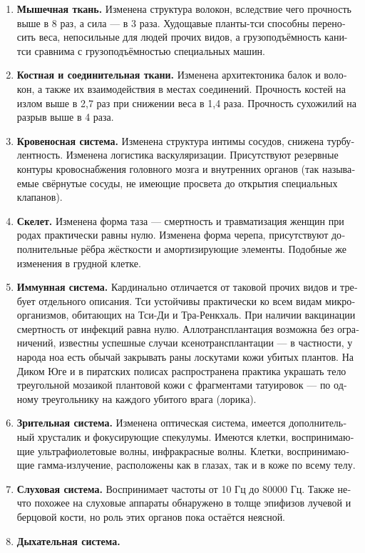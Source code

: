 \documentclass[a4paper,12pt,fleqn]{book}\usepackage{polyglossia}\setdefaultlanguage[babelshorthands=true]{russian}\setotherlanguage{english}\defaultfontfeatures{Ligatures=TeX,Mapping=tex-text}\usepackage{xcolor}\newcommand{\ml}[3]{#2}
\begin{document}
\begin{enumerate}
\item \textbf{Мышечная ткань.}
Изменена структура волокон, вследствие чего прочность выше в 8 раз, а сила --- в 3 раза.
Худощавые планты-тси способны переносить веса, непосильные для людей прочих видов, а грузоподъёмность кани-тси сравнима с грузоподъёмностью специальных машин.
\item \textbf{Костная и соединительная ткани.}
Изменена архитектоника балок и волокон, а также их взаимодействия в местах соединений.
Прочность костей на излом выше в 2,7 раз при снижении веса в 1,4 раза.
Прочность сухожилий на разрыв выше в 4 раза.
\item \textbf{Кровеносная система.}
Изменена структура интимы сосудов, снижена турбулентность.
Изменена логистика васкуляризации.
Присутствуют резервные контуры кровоснабжения головного мозга и внутренних органов (так называемые свёрнутые сосуды, не имеющие просвета до открытия специальных клапанов).
\item \textbf{Скелет.}
Изменена форма таза --- смертность и травматизация женщин при родах практически равны нулю.
Изменена форма черепа, присутствуют дополнительные рёбра жёсткости и амортизирующие элементы.
Подобные же изменения в грудной клетке.
\item \textbf{Иммунная система.}
Кардинально отличается от таковой прочих видов и требует отдельного описания.
Тси устойчивы практически ко всем видам микроорганизмов, обитающих на Тси-Ди и Тра-Ренкхаль.
При наличии вакцинации смертность от инфекций равна нулю.
Аллотрансплантация возможна без ограничений, известны успешные случаи ксенотрансплантации --- в частности, у народа ноа есть обычай закрывать раны лоскутами кожи убитых плантов.
На Диком Юге и в пиратских полисах распространена практика украшать тело треугольной мозаикой плантовой кожи с фрагментами татуировок --- по одному треугольнику на каждого убитого врага (лорика).
\item \textbf{Зрительная система.}
Изменена оптическая система, имеется дополнительный хрусталик и фокусирующие спекулумы.
Имеются клетки, воспринимающие ультрафиолетовые волны, инфракрасные волны.
Клетки, воспринимающие гамма-излучение, расположены как в глазах, так и в коже по всему телу.
\item \textbf{Слуховая система.}
Воспринимает частоты от 10 Гц до 80000 Гц.
Также нечто похожее на слуховые аппараты обнаружено в толще эпифизов лучевой и берцовой кости, но роль этих органов пока остаётся неясной.
\item \textbf{Дыхательная система.}

\end{enumerate}
\end{document}
